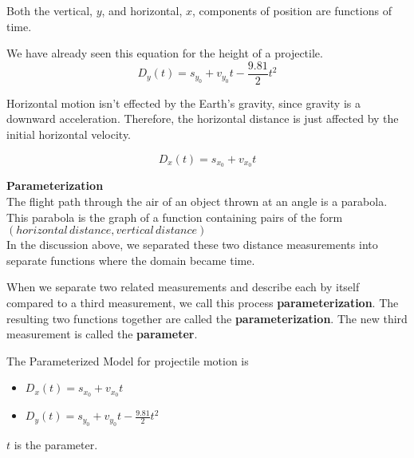\documentclass{ximera}
\begin{document}
Both the vertical, $y$, and horizontal, $x$, components of position are functions of time.

We have already seen this equation for the height of a projectile.
\[ D_y(t) = s_{y_0} + v_{y_0} t - \frac{9.81}{2} t^2  \]

Horizontal motion isn't effected by the Earth's gravity, since gravity is a downward acceleration. Therefore, the horizontal distance is just affected by the initial horizontal velocity.


\[ D_x(t) = s_{x_0} + v_{x_0} t  \]






\begin{definition} \textbf{\textcolor{green!50!black}{Parameterization}} \\

The flight path through the air of an object thrown at an angle is a parabola.  This parabola is the graph of a function containing pairs of the form $(horizontal \, distance, vertical \,distance)$ \\

In the discussion above, we separated these two distance measurements into separate functions where the domain became time.



When we separate two related measurements and describe each by itself compared to a third measurement, we call this process \textbf{parameterization}.  The resulting two functions together are called the \textbf{parameterization}.  The new third measurement is called the \textbf{parameter}.





\begin{model} 


The Parameterized Model for projectile motion is


\begin{itemize}
\item $D_x(t) = s_{x_0} + v_{x_0} t$
\item $D_y(t) = s_{y_0} + v_{y_0} t - \frac{9.81}{2} t^2$
\end{itemize}

$t$ is the parameter.

\end{model}



\end{definition}
\end{document}

